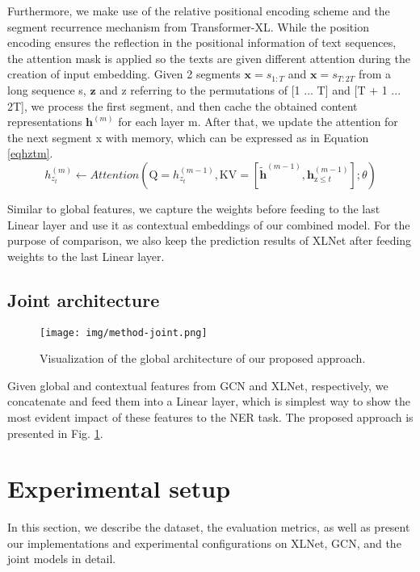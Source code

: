 \documentclass[runningheads]{llncs}
\begin{document}
Furthermore, we make use of the relative positional encoding scheme and the segment recurrence mechanism from Transformer-XL. 
While the position encoding ensures the reflection in the positional information of text sequences, the attention mask is applied so the texts are given different attention during the creation of input embedding. 
Given 2 segments $\mathbf{x} = s_{1:T}$ and $\mathbf{x} = s_{T:2T}$ from a long sequence s,
$\mathbf{z}$ and z referring to the permutations of [1 ... T] and [T + 1 ... 2T], we process the first segment, and then cache the obtained content representations $\mathbf{h}^{(m)}$ for each layer m. After that, we update the attention for the next segment x with memory, which can be expressed as in Equation \ref{eqhztm}.
\begin{equation}
\label{eqhztm}
h_{z_{t}}^{(m)} \leftarrow  Attention\left(\mathrm{Q}=h_{z_{t}}^{(m-1)}, \mathrm{KV}=\left[\tilde{\mathbf{h}}^{(m-1)}, \mathbf{h}_{\mathrm{z} \leq t}^{(m-1)}\right] ; \theta\right)
\end{equation}

Similar to global features, we capture the weights before feeding to the last Linear layer and use it as contextual embeddings of our combined model. For the purpose of comparison, we also keep the prediction results of XLNet after feeding weights to the last Linear layer.
\vspace{-0.3cm}
\subsection{Joint architecture}
\begin{figure}[ht]
  \centering
  \texttt{[image: img/method-joint.png]}
  \vspace{-0.3cm}
  \caption{Visualization of the global architecture of our proposed approach.}
  \label{fig:mix}
\end{figure}

Given global and contextual features from GCN and XLNet, respectively, we concatenate and feed them into a Linear layer, which is simplest way to show the most evident impact of these features to the NER task. The proposed approach is presented in Fig. \ref{fig:mix}. 
\vspace{-0.2cm}
\section{Experimental setup}
\label{sec:expe}

In this section, we describe the dataset, the evaluation metrics, as well as present our implementations and experimental configurations on XLNet, GCN, and the joint models in detail. 
\vspace{-0.7cm}
\end{document}
